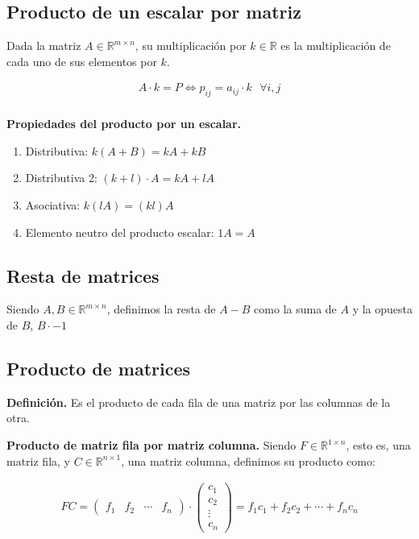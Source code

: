 \documentclass[12pt]{article}
\begin{document}
\subsection{Producto de un escalar por matriz}

Dada la matriz \(A \in \mathbb{R}^{m \times n}\),
su multiplicación por \(k \in \mathbb{R}\) es la
multiplicación de cada uno de sus elementos por \(k\).

\begin{align*}
  A \cdot k = P \iff p_{ij} = a_{ij} \cdot k \text{ } \forall i,j \\
\end{align*}

\textbf{Propiedades del producto por un escalar.}

\begin{enumerate}
  \item Distributiva: \(k(A + B) = kA + kB\)
  \item Distributiva 2: \((k + l) \cdot A = kA + lA\)
  \item Asociativa: \(k(lA) = (kl)A\)
  \item Elemento neutro del producto escalar: \(1A = A\)
\end{enumerate}

\subsection{Resta de matrices}

Siendo \(A, B \in \mathbb{R}^{m \times n}\),
definimos la resta de \(A - B\) como la suma de \(A\) y la opuesta de \(B\),
\(B \cdot -1\)

\subsection{Producto de matrices}

\textbf{Definición.}
Es el producto de cada fila de una matriz por las columnas de la otra.

\textbf{Producto de matriz fila por matriz columna.}
Siendo \(F \in \mathbb{R}^{1 \times n}\),
esto es,
una matriz fila,
y \(C \in \mathbb{R}^{n \times 1}\),
una matriz columna,
definimos su producto como:

\begin{align*}
  FC = \begin{pmatrix}
         f_{1} & f_{2} & \cdots & f_{n}
       \end{pmatrix}
  \cdot \begin{pmatrix}
          c_{1}  \\
          c_{2}  \\
          \vdots \\
          c_{n}
        \end{pmatrix}
  = f_{1}c_{1} + f_{2}c_{2} + \cdots + f_{n}c_{n} \\
\end{align*}
\end{document}
